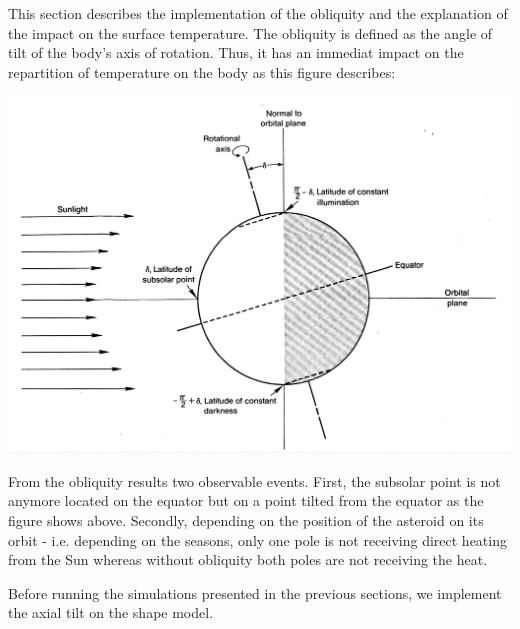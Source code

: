 This section describes the implementation of the obliquity and the explanation of the impact on the surface temperature. The obliquity is defined as the angle of tilt of the body's axis of rotation. Thus, it has an immediat impact on the repartition of temperature on the body as this figure describes: 
\begin{center}
    \includegraphics[width=\linewidth]{rsc/obliquity.png}
    \label{fig:6.1}
\end{center}
From the obliquity results two observable events. First, the subsolar point is not anymore located on the equator but on a point tilted from the equator as the figure shows above. Secondly, depending on the position of the asteroid on its orbit - i.e. depending on the seasons, only one pole is not receiving direct heating from the Sun whereas without obliquity both poles are not receiving the heat.

Before running the simulations presented in the previous sections, we implement the axial tilt on the shape model.

